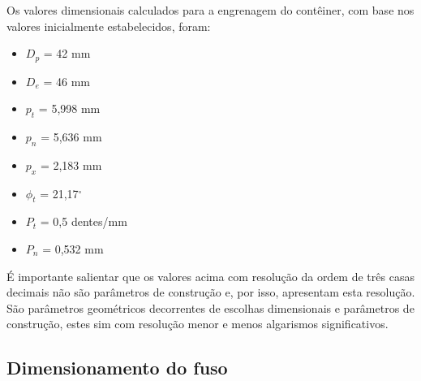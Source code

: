 Os valores dimensionais calculados para a engrenagem do contêiner, com base nos valores inicialmente estabelecidos, foram:

\begin{itemize}\label{calculo_fuso}
    \item $D_p$ = 42 mm
    \item $D_e$ = 46 mm
    \item $p_t$ = 5,998 mm
    \item $p_n$ = 5,636 mm
    \item $p_x$ = 2,183 mm
    \item $\phi_t$ = 21,17$^{\circ}$
    \item $P_t$ = 0,5 dentes/mm
    \item $P_n$ = 0,532 mm
\end{itemize}

É importante salientar que os valores acima com resolução da ordem de três casas decimais não são parâmetros de construção e, por isso, apresentam esta resolução. São parâmetros geométricos decorrentes de escolhas dimensionais e parâmetros de construção, estes sim com resolução menor e menos algarismos significativos.



\subsection{Dimensionamento do fuso} 


